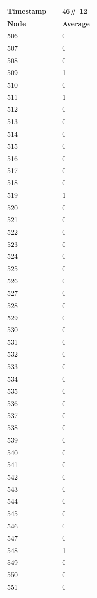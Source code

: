 \begin{tabular}{|l||l|}
\hline
\textbf{Timestamp =} & \textbf{46}\# 12\\\hline
	\textbf{Node} & \textbf{Average} \\ \hline
\hline
	506 & 0 \\ \hline
	507 & 0 \\ \hline
	508 & 0 \\ \hline
	509 & 1 \\ \hline
	510 & 0 \\ \hline
	511 & 1 \\ \hline
	512 & 0 \\ \hline
	513 & 0 \\ \hline
	514 & 0 \\ \hline
	515 & 0 \\ \hline
	516 & 0 \\ \hline
	517 & 0 \\ \hline
	518 & 0 \\ \hline
	519 & 1 \\ \hline
	520 & 0 \\ \hline
	521 & 0 \\ \hline
	522 & 0 \\ \hline
	523 & 0 \\ \hline
	524 & 0 \\ \hline
	525 & 0 \\ \hline
	526 & 0 \\ \hline
	527 & 0 \\ \hline
	528 & 0 \\ \hline
	529 & 0 \\ \hline
	530 & 0 \\ \hline
	531 & 0 \\ \hline
	532 & 0 \\ \hline
	533 & 0 \\ \hline
	534 & 0 \\ \hline
	535 & 0 \\ \hline
	536 & 0 \\ \hline
	537 & 0 \\ \hline
	538 & 0 \\ \hline
	539 & 0 \\ \hline
	540 & 0 \\ \hline
	541 & 0 \\ \hline
	542 & 0 \\ \hline
	543 & 0 \\ \hline
	544 & 0 \\ \hline
	545 & 0 \\ \hline
	546 & 0 \\ \hline
	547 & 0 \\ \hline
	548 & 1 \\ \hline
	549 & 0 \\ \hline
	550 & 0 \\ \hline
	551 & 0 \\ \hline
\end{tabular}

